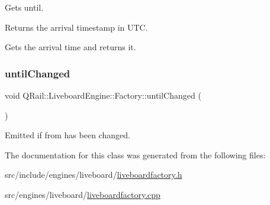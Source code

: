 Gets until. 

\begin{DoxyReturn}{Returns}
the arrival timestamp in U\+TC.
\end{DoxyReturn}
Gets the arrival time and returns it. \mbox{\label{classQRail_1_1LiveboardEngine_1_1Factory_a81b9ba54949f8389e63a65c4e91e3d19}} 
\subsubsection{\texorpdfstring{untilChanged}{untilChanged}}
{\footnotesize\ttfamily void Q\+Rail\+::\+Liveboard\+Engine\+::\+Factory\+::until\+Changed (\begin{DoxyParamCaption}{ }\end{DoxyParamCaption})\hspace{0.3cm}{\ttfamily [signal]}}



Emitted if from has been changed. 



The documentation for this class was generated from the following files\+:\begin{DoxyCompactItemize}
\item 
src/include/engines/liveboard/\mbox{\hyperlink{liveboardfactory_8h}{liveboardfactory.\+h}}\item 
src/engines/liveboard/\mbox{\hyperlink{liveboardfactory_8cpp}{liveboardfactory.\+cpp}}\end{DoxyCompactItemize}
